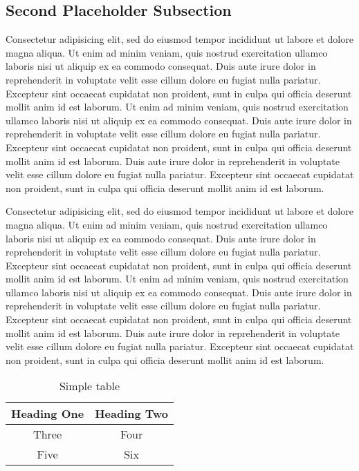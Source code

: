 \documentclass[a4paper]{article}
\begin{document}
\subsection{Second Placeholder Subsection}
Consectetur adipisicing elit, sed do eiusmod tempor incididunt ut labore et
dolore magna aliqua. Ut enim ad minim veniam, quis nostrud exercitation ullamco
laboris nisi ut aliquip ex ea commodo consequat. Duis aute irure dolor in
reprehenderit in voluptate velit esse cillum dolore eu fugiat nulla pariatur.
Excepteur sint occaecat cupidatat non proident, sunt in culpa qui officia
deserunt mollit anim id est laborum. Ut enim ad minim veniam, quis nostrud
exercitation ullamco laboris nisi ut aliquip ex ea commodo consequat. Duis aute
irure dolor in reprehenderit in voluptate velit esse cillum dolore eu fugiat
nulla pariatur. Excepteur sint occaecat cupidatat non proident, sunt in culpa
qui officia deserunt mollit anim id est laborum. Duis aute irure dolor in
reprehenderit in voluptate velit esse cillum dolore eu fugiat nulla pariatur.
Excepteur sint occaecat cupidatat non proident, sunt in culpa qui officia
deserunt mollit anim id est laborum.


Consectetur adipisicing elit, sed do eiusmod tempor incididunt ut labore et
dolore magna aliqua. Ut enim ad minim veniam, quis nostrud exercitation ullamco
laboris nisi ut aliquip ex ea commodo consequat. Duis aute irure dolor in
reprehenderit in voluptate velit esse cillum dolore eu fugiat nulla pariatur.
Excepteur sint occaecat cupidatat non proident, sunt in culpa qui officia
deserunt mollit anim id est laborum. Ut enim ad minim veniam, quis nostrud
exercitation ullamco laboris nisi ut aliquip ex ea commodo consequat. Duis aute
irure dolor in reprehenderit in voluptate velit esse cillum dolore eu fugiat
nulla pariatur. Excepteur sint occaecat cupidatat non proident, sunt in culpa
qui officia deserunt mollit anim id est laborum. Duis aute irure dolor in
reprehenderit in voluptate velit esse cillum dolore eu fugiat nulla pariatur.
Excepteur sint occaecat cupidatat non proident, sunt in culpa qui officia
deserunt mollit anim id est laborum.

\begin{table}\label{tab:my_table}
\renewcommand{\arraystretch}{1.3}
\caption{Simple table} \label{table_example} \centering
\begin{tabular}{c|c}
    \hline
    Heading One     &   Heading Two\\
    \hline
    \hline

    Three   &   Four\\
    \hline

    Five    &   Six\\
    \hline
\end{tabular}
\end{table}
\end{document}

